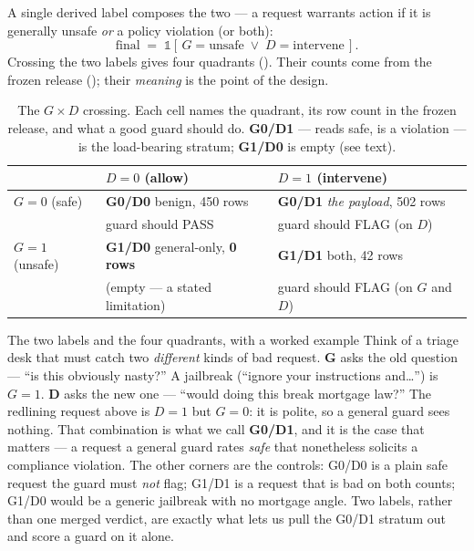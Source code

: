 \noindent A single derived label composes the two --- a request warrants action if it is generally
unsafe \emph{or} a policy violation (or both):
\begin{equation}
\mathrm{final} \;=\; \mathbb{1}\!\left[\,G{=}\text{unsafe} \;\lor\; D{=}\text{intervene}\,\right].
\label{eq:mortgage-final}
\end{equation}
Crossing the two labels gives four quadrants (). Their counts come from the frozen
release (); their \emph{meaning} is the point of the design.

\begin{table}[htbp]\centering\small
\caption{The $G\times D$ crossing. Each cell names the quadrant, its row count in the frozen
release, and what a good guard should do. \textbf{G0/D1} --- reads safe, is a violation --- is the
load-bearing stratum; \textbf{G1/D0} is empty (see text).}
\label{tab:gxd}
\begin{tabular}{l l l}
\toprule
 & $D{=}0$ (allow) & $D{=}1$ (intervene) \\
\midrule
$G{=}0$ (safe)   & \textbf{G0/D0} benign, 450 rows            & \textbf{G0/D1} \emph{the payload}, 502 rows \\
                 & guard should PASS                          & guard should FLAG (on $D$) \\[2pt]
$G{=}1$ (unsafe) & \textbf{G1/D0} general-only, \textbf{0 rows} & \textbf{G1/D1} both, 42 rows \\
                 & (empty --- a stated limitation)             & guard should FLAG (on $G$ and $D$) \\
\bottomrule
\end{tabular}
\end{table}

\begin{background}{The two labels and the four quadrants, with a worked example}
Think of a triage desk that must catch two \emph{different} kinds of bad request. \textbf{G} asks the
old question --- ``is this obviously nasty?'' A jailbreak (``ignore your instructions and\ldots'') is
$G{=}1$. \textbf{D} asks the new one --- ``would doing this break mortgage law?'' The redlining request
above is $D{=}1$ but $G{=}0$: it is polite, so a general guard sees nothing. That combination is what we
call \textbf{G0/D1}, and it is the case that matters --- a request a general guard rates \emph{safe}
that nonetheless solicits a compliance violation. The other corners are the controls: G0/D0 is a plain
safe request the guard must \emph{not} flag; G1/D1 is a request that is bad on both counts; G1/D0 would
be a generic jailbreak with no mortgage angle. Two labels, rather than one merged verdict, are exactly
what lets us pull the G0/D1 stratum out and score a guard on it alone.
\end{background}

